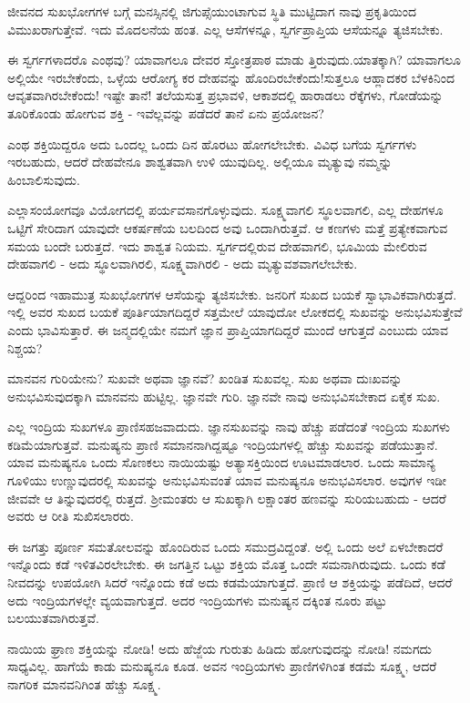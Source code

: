 ಜೀವನದ ಸುಖಭೋಗಗಳ ಬಗ್ಗೆ ಮನಸ್ಸಿನಲ್ಲಿ ಜಿಗುಪ್ಸೆಯುಂಟಾಗುವ ಸ್ಥಿತಿ ಮುಟ್ಟಿದಾಗ ನಾವು ಪ್ರಕೃತಿಯಿಂದ ವಿಮುಖರಾಗುತ್ತೇವೆ. ಇದು ಮೊದಲನೆಯ ಹಂತ. ಎಲ್ಲ ಆಸೆಗಳನ್ನೂ, ಸ್ವರ್ಗಪ್ರಾಪ್ತಿಯ ಆಸೆಯನ್ನೂ ತ್ಯಜಿಸಬೇಕು.

ಈ ಸ್ವರ್ಗಗಳಾದರೊ ಎಂಥವು? ಯಾವಾಗಲೂ ದೇವರ ಸ್ತೋತ್ರಪಾಠ ಮಾಡು ತ್ತಿರುವುದು.ಯಾತಕ್ಕಾಗಿ? ಯಾವಾಗಲೂ ಅಲ್ಲಿಯೇ ಇರಬೇಕೆಂದು, ಒಳ್ಳೆಯ ಆರೋಗ್ಯ ಕರ ದೇಹವನ್ನು ಹೊಂದಿರಬೇಕೆಂದು!ಸುತ್ತಲೂ ಆಹ್ಲಾದಕರ ಬೆಳಕಿನಿಂದ ಆವೃತವಾಗಿರಬೇಕೆಂದು! ಇಷ್ಟೇ ತಾನೆ! ತಲೆಯಸುತ್ತ ಪ್ರಭಾವಳಿ, ಆಕಾಶದಲ್ಲಿ ಹಾರಾಡಲು ರೆಕ್ಕೆಗಳು, ಗೋಡೆಯನ್ನು ತೂರಿಕೊಂಡು ಹೋಗುವ ಶಕ್ತಿ - ಇವೆಲ್ಲವನ್ನು ಪಡೆದರೆ ತಾನೆ ಏನು ಪ್ರಯೋಜನ?

ಎಂಥ ಶಕ್ತಿಯಿದ್ದರೂ ಅದು ಒಂದಲ್ಲ ಒಂದು ದಿನ ಹೊರಟು ಹೋಗಲೇಬೇಕು. ವಿವಿಧ ಬಗೆಯ ಸ್ವರ್ಗಗಳು ಇರಬಹುದು, ಆದರೆ ದೇಹವೇನೂ ಶಾಶ್ವತವಾಗಿ ಉಳಿ ಯುವುದಿಲ್ಲ. ಅಲ್ಲಿಯೂ ಮೃತ್ಯುವು ನಮ್ಮನ್ನು ಹಿಂಬಾಲಿಸುವುದು.

ಎಲ್ಲಾಸಂಯೋಗವೂ ವಿಯೋಗದಲ್ಲಿ ಪರ್ಯವಸಾನಗೊಳ್ಳುವುದು. ಸೂಕ್ಷ್ಮವಾಗಲಿ ಸ್ಥೂಲವಾಗಲಿ, ಎಲ್ಲ ದೇಹಗಳೂ ಒಟ್ಟಿಗೆ ಸೇರಿದಾಗ ಯಾವುದೇ ಆಕರ್ಷಣೆಯ ಬಲದಿಂದ ಅವು ಒಂದಾಗಿರುತ್ತವೆ. ಆ ಕಣಗಳು ಮತ್ತೆ ಪ್ರತ್ಯೇಕವಾಗುವ ಸಮಯ ಬಂದೇ ಬರುತ್ತದೆ. ಇದು ಶಾಶ್ವತ ನಿಯಮ. ಸ್ವರ್ಗದಲ್ಲಿರುವ ದೇಹವಾಗಲಿ, ಭೂಮಿಯ ಮೇಲಿರುವ ದೇಹವಾಗಲಿ - ಅದು ಸ್ಥೂಲವಾಗಿರಲಿ, ಸೂಕ್ಷ್ಮವಾಗಿರಲಿ - ಅದು ಮೃತ್ಯುವಶವಾಗಲೇಬೇಕು.

ಆದ್ದರಿಂದ ಇಹಾಮುತ್ರ ಸುಖಭೋಗಗಳ ಆಸೆಯನ್ನು ತ್ಯಜಿಸಬೇಕು. ಜನರಿಗೆ ಸುಖದ ಬಯಕೆ ಸ್ವಾಭಾವಿಕವಾಗಿರುತ್ತದೆ. ಇಲ್ಲಿ ಅವರ ಸುಖದ ಬಯಕೆ ಪೂರ್ತಿಯಾಗದಿದ್ದರೆ ಸತ್ತಮೇಲೆ ಯಾವುದೋ ಲೋಕದಲ್ಲಿ ಸುಖವನ್ನು ಅನುಭವಿಸುತ್ತೇವೆ ಎಂದು ಭಾವಿಸುತ್ತಾರೆ. ಈ ಜನ್ಮದಲ್ಲಿಯೇ ನಮಗೆ ಜ್ಞಾನ ಪ್ರಾಪ್ತಿಯಾಗದಿದ್ದರೆ ಮುಂದೆ ಆಗುತ್ತದೆ ಎಂಬುದು ಯಾವ ನಿಶ್ಚಯ?

ಮಾನವನ ಗುರಿಯೇನು? ಸುಖವೇ ಅಥವಾ ಜ್ಞಾನವೆ? ಖಂಡಿತ ಸುಖವಲ್ಲ. ಸುಖ ಅಥವಾ ದುಃಖವನ್ನು ಅನುಭವಿಸುವುದಕ್ಕಾಗಿ ಮಾನವನು ಹುಟ್ಟಿಲ್ಲ. ಜ್ಞಾನವೇ ಗುರಿ. ಜ್ಞಾನವೇ ನಾವು ಅನುಭವಿಸಬೇಕಾದ ಏಕೈಕ ಸುಖ.

ಎಲ್ಲ ಇಂದ್ರಿಯ ಸುಖಗಳೂ ಪ್ರಾಣಿಸಹಜವಾದುದು. ಜ್ಞಾನಸುಖವನ್ನು ನಾವು ಹೆಚ್ಚು ಪಡೆದಂತೆ ಇಂದ್ರಿಯ ಸುಖಗಳು ಕಡಿಮೆಯಾಗುತ್ತವೆ. ಮನುಷ್ಯನು ಪ್ರಾಣಿ ಸಮಾನನಾಗಿದ್ದಷ್ಟೂ ಇಂದ್ರಿಯಗಳಲ್ಲಿ ಹೆಚ್ಚು ಸುಖವನ್ನು ಪಡೆಯುತ್ತಾನೆ. ಯಾವ ಮನುಷ್ಯನೂ ಒಂದು ಸೊಣಕಲು ನಾಯಿಯಷ್ಟು ಅತ್ಯಾಸಕ್ತಿಯಿಂದ ಊಟಮಾಡಲಾರ. ಒಂದು ಸಾಮಾನ್ಯ ಗೂಳಿಯು ಉಣ್ಣುವುದರಲ್ಲಿ ಸುಖವನ್ನು ಅನುಭವಿಸುವಂತೆ ಯಾವ ಮನುಷ್ಯನೂ ಅನುಭವಿಸಲಾರ. ಅವುಗಳ ಇಡೀ ಜೀವವೇ ಆ ತಿನ್ನುವುದರಲ್ಲಿ ರುತ್ತದೆ. ಶ‍್ರೀಮಂತರು ಆ ಸುಖಕ್ಕಾಗಿ ಲಕ್ಷಾಂತರ ಹಣವನ್ನು ಸುರಿಯಬಹುದು - ಆದರೆ ಅವರು ಆ ರೀತಿ ಸುಖಿಸಲಾರರು.

ಈ ಜಗತ್ತು ಪೂರ್ಣ ಸಮತೋಲವನ್ನು ಹೊಂದಿರುವ ಒಂದು ಸಮುದ್ರವಿದ್ದಂತೆ. ಅಲ್ಲಿ ಒಂದು ಅಲೆ ಏಳಬೇಕಾದರೆ ಇನ್ನೊಂದು ಕಡೆ ಇಳಿತವಿರಲೇಬೇಕು. ಈ ಜಗತ್ತಿನ ಒಟ್ಟು ಶಕ್ತಿಯ ಮೊತ್ತ ಒಂದೇ ಸಮನಾಗಿರುವುದು. ಒಂದು ಕಡೆ ನೀವದನ್ನು ಉಪಯೋಗಿ ಸಿದರೆ ಇನ್ನೊಂದು ಕಡೆ ಅದು ಕಡಮೆಯಾಗುತ್ತದೆ. ಪ್ರಾಣಿ ಆ ಶಕ್ತಿಯನ್ನು ಪಡೆದಿದೆ, ಆದರೆ ಅದು ಇಂದ್ರಿಯಗಳಲ್ಲೇ ವ್ಯಯವಾಗುತ್ತದೆ. ಅದರ ಇಂದ್ರಿಯಗಳು ಮನುಷ್ಯನ ದಕ್ಕಿಂತ ನೂರು ಪಟ್ಟು ಬಲಯುತವಾಗಿರುತ್ತವೆ.

ನಾಯಿಯ ಘ್ರಾಣ ಶಕ್ತಿಯನ್ನು ನೋಡಿ! ಅದು ಹೆಜ್ಜೆಯ ಗುರುತು ಹಿಡಿದು ಹೋಗುವುದನ್ನು ನೋಡಿ! ನಮಗದು ಸಾಧ್ಯವಿಲ್ಲ. ಹಾಗೆಯೆ ಕಾಡು ಮನುಷ್ಯನೂ ಕೂಡ. ಅವನ ಇಂದ್ರಿಯಗಳು ಪ್ರಾಣಿಗಳಿಗಿಂತ ಕಡಮೆ ಸೂಕ್ಷ್ಮ, ಆದರೆ ನಾಗರಿಕ ಮಾನವನಿಗಿಂತ ಹೆಚ್ಚು ಸೂಕ್ಷ್ಮ.

